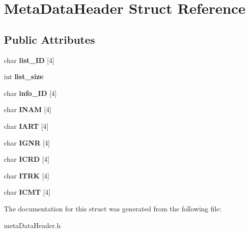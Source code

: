 \hypertarget{structMetaDataHeader}{}\section{Meta\+Data\+Header Struct Reference}
\label{structMetaDataHeader}
\subsection*{Public Attributes}
\begin{DoxyCompactItemize}
\item 
\mbox{\label{structMetaDataHeader_af7f56239f7f1b01f7f6ae8add64205ed}} 
char {\bfseries list\+\_\+\+ID} \mbox{[}4\mbox{]}
\item 
\mbox{\label{structMetaDataHeader_aa235aaa4faacbabeefff7826c26138aa}} 
int {\bfseries list\+\_\+size}
\item 
\mbox{\label{structMetaDataHeader_a779d334b540619b63dca0e358541a090}} 
char {\bfseries info\+\_\+\+ID} \mbox{[}4\mbox{]}
\item 
\mbox{\label{structMetaDataHeader_ac9f19ee24f2fff3b5523f030fab3bcda}} 
char {\bfseries I\+N\+AM} \mbox{[}4\mbox{]}
\item 
\mbox{\label{structMetaDataHeader_a8fe99df1dfb8d69c1612143ac4c82d0e}} 
char {\bfseries I\+A\+RT} \mbox{[}4\mbox{]}
\item 
\mbox{\label{structMetaDataHeader_acadba7d97e8b2b2a843a71bbf76e97e6}} 
char {\bfseries I\+G\+NR} \mbox{[}4\mbox{]}
\item 
\mbox{\label{structMetaDataHeader_a2435af974df4fc495280dcf127ce611d}} 
char {\bfseries I\+C\+RD} \mbox{[}4\mbox{]}
\item 
\mbox{\label{structMetaDataHeader_a0c8d9fb197104a3cd120da5f38ce2d02}} 
char {\bfseries I\+T\+RK} \mbox{[}4\mbox{]}
\item 
\mbox{\label{structMetaDataHeader_a9a6ff89240d236f006a8cf97826de034}} 
char {\bfseries I\+C\+MT} \mbox{[}4\mbox{]}
\end{DoxyCompactItemize}


The documentation for this struct was generated from the following file\+:\begin{DoxyCompactItemize}
\item 
meta\+Data\+Header.\+h\end{DoxyCompactItemize}
